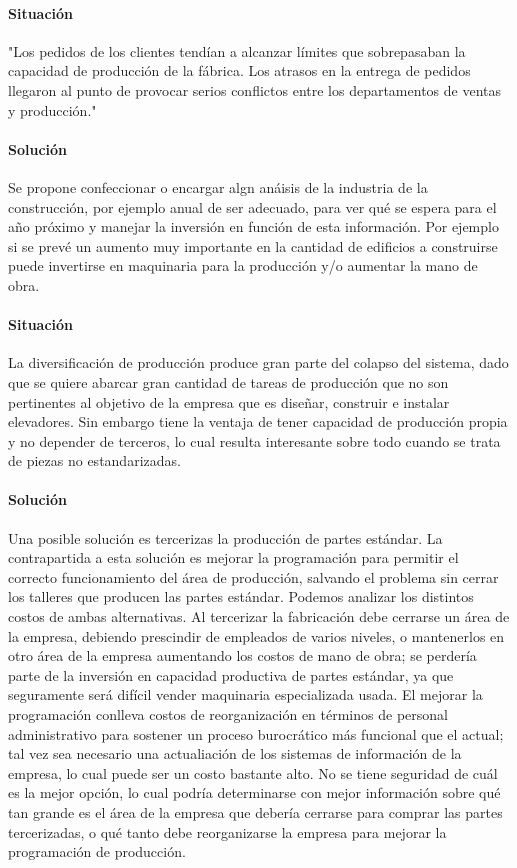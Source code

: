\documentclass[12pt,a4paper,spanish]{article}
\begin{document}
\paragraph{Situaci\'on}
"Los pedidos de los clientes tend\'ian a alcanzar l\'imites que sobrepasaban la capacidad de producci\'on de la f\'abrica. Los atrasos en la entrega de pedidos llegaron al punto de provocar serios conflictos entre los departamentos de ventas y producci\'on."
\paragraph{Soluci\'on}
Se propone confeccionar o encargar algn an\'aisis de la industria de la construcci\'on, por ejemplo anual de ser adecuado, para ver qu\'e se espera para el a\~no pr\'oximo y manejar la inversi\'on en funci\'on de esta informaci\'on. Por ejemplo si se prev\'e un aumento muy importante en la cantidad de edificios a construirse puede invertirse en maquinaria para la producci\'on y/o aumentar la mano de obra.

\paragraph{Situaci\'on}
La diversificaci\'on de producci\'on produce gran parte del colapso del sistema, dado que se quiere abarcar gran cantidad de tareas de producci\'{o}n que no son pertinentes al objetivo de la empresa que es dise\~nar, construir e instalar elevadores. Sin embargo tiene la ventaja de tener capacidad de producci\'on propia y no depender de terceros, lo cual resulta interesante sobre todo cuando se trata de piezas no estandarizadas.
\paragraph{Soluci\'on}
Una posible soluci\'on es tercerizas la producci\'on de partes est\'andar. La contrapartida a esta soluci\'on es mejorar la programaci\'on para permitir el correcto funcionamiento del \'area de producci\'on, salvando el problema sin cerrar los talleres que producen las partes est\'andar. Podemos analizar los distintos costos de ambas alternativas. Al tercerizar la fabricaci\'on debe cerrarse un \'area de la empresa, debiendo prescindir de empleados de varios niveles, o mantenerlos en otro \'area de la empresa aumentando los costos de mano de obra; se perder\'ia parte de la inversi\'on en capacidad productiva de partes est\'andar, ya que seguramente ser\'a dif\'icil vender maquinaria especializada usada. El mejorar la programaci\'on conlleva costos de reorganizaci\'on en t\'erminos de personal administrativo para sostener un proceso burocr\'atico m\'as funcional que el actual; tal vez sea necesario una actualiaci\'on de los sistemas de informaci\'on de la empresa, lo cual puede ser un costo bastante alto. No se tiene seguridad de cu\'al es la mejor opci\'on, lo cual podr\'ia determinarse con mejor informaci\'on sobre qu\'e tan grande es el \'area de la empresa que deber\'ia cerrarse para comprar las partes tercerizadas, o qu\'e tanto debe reorganizarse la empresa para mejorar la programaci\'on de producci\'on.
\end{document}
